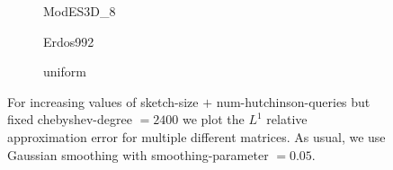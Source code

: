 \begin{figure}[ht]
    \centering
    \begin{subfigure}[b]{0.49\columnwidth}
        
        \caption{ModES3D\_8}
        \label{fig:5-experiments-multi-matrix-convergence-ModES3D}
    \end{subfigure}
    \begin{subfigure}[b]{0.49\columnwidth}
        
        \caption{Erdos992}
        \label{fig:5-experiments-multi-matrix-convergence-Erdos}
    \end{subfigure}
    \begin{subfigure}[b]{0.49\columnwidth}
        
        \caption{uniform}
        \label{fig:5-experiments-multi-matrix-convergence-uniform}
    \end{subfigure}
    \caption{For increasing values of \gls{sketch-size} $+$ \gls{num-hutchinson-queries}
    but fixed \gls{chebyshev-degree} $=2400$ we plot the $L^1$ relative approximation error 
    for multiple different matrices. As usual, we use
    Gaussian smoothing with \gls{smoothing-parameter} $=0.05$.}
    \label{fig:5-experiments-multi-matrix-convergence}
\end{figure}
